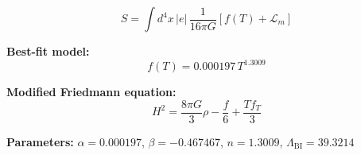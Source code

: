 
\begin{equation}
  S = \int d^4x \, |e| \, \frac{1}{16\pi G} \left[ f(T) + \mathcal{L}_m \right]
\end{equation}

\textbf{Best-fit model:}
\begin{equation}
  f(T) = 0.000197 \, T^{1.3009}
\end{equation}

\textbf{Modified Friedmann equation:}
\begin{equation}
  H^2 = \frac{8\pi G}{3} \rho - \frac{f}{6} + \frac{T f_T}{3}
\end{equation}

\textbf{Parameters:}
$\alpha = 0.000197$, \quad
$\beta = -0.467467$, \quad
$n = 1.3009$, \quad
$\Lambda_{\text{BI}} = 39.3214$